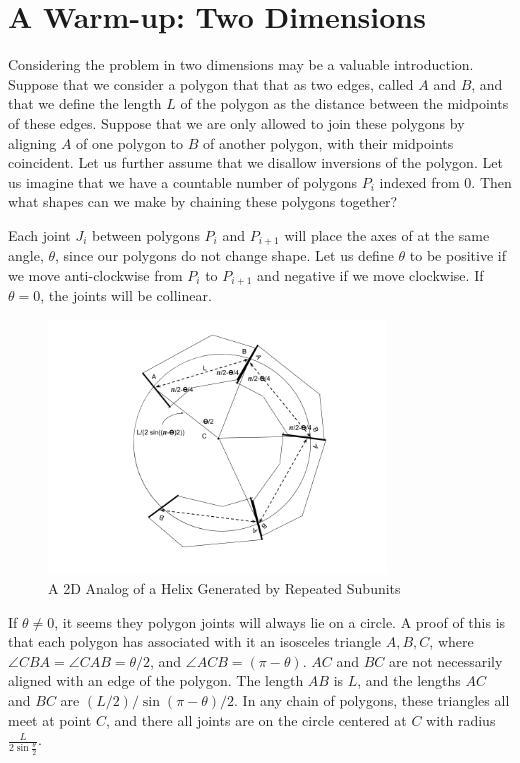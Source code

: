 \documentclass[11pt]{article}
\begin{document}
{\section{A Warm-up: Two Dimensions}

Considering the problem in two dimensions may be a valuable introduction.
Suppose that we consider a polygon that that as two edges, called $A$ and $B$, and that we define the length $L$ of the
polygon as the distance between the midpoints of these edges. Suppose that we are only allowed to join these
polygons by aligning $A$ of one polygon to $B$ of another polygon, with their midpoints coincident. Let us
further assume that we disallow inversions of the polygon.  Let us imagine that we have a
countable number of polygons $P_i$ indexed from $0$. Then what shapes can we make by chaining these
polygons together?

Each joint $J_i$ between polygons $P_i$ and $P_{i+1}$ will place the axes of at the same angle, $\theta$, since
our polygons do not change shape. Let us define $\theta$ to be positive
if we move anti-clockwise from $P_i$ to $P_{i+1}$ and negative if we move clockwise.
If $\theta = 0$, the joints will be collinear.

\begin{figure}
     \centering
     \includegraphics[width=0.80\textwidth]{figures/2DPolygonStacking.png}
     \caption{A 2D Analog of a Helix Generated by Repeated Subunits}
  \label{fig:prismdiagram}
\end{figure}

If $\theta \neq 0$, it seems they polygon joints will always lie on a circle. A proof of this
is that each polygon has associated with it an isosceles triangle $A,B,C$, where $\angle CBA = \angle CAB = \theta/2$,
and $\angle ACB = (\pi - \theta)$. $AC$ and $BC$ are not necessarily aligned with an edge of the polygon.
The length $AB$ is $L$, and the lengths $AC$ and $BC$ are
$(L/2) / \sin{(\pi - \theta)/2}$. In any chain of polygons, these triangles all meet at point $C$, and there all
joints are on the circle centered at $C$ with radius $\frac{L}{2 \sin{\frac{\theta}{2}}}$.


}
\end{document}
